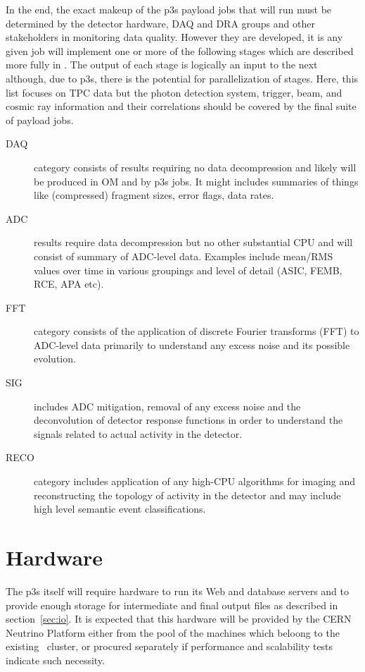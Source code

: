 \documentclass[pdftex,12pt,letter]{article}
\begin{document}
In the end, the exact makeup of the p3s payload jobs that will run
must be determined by the detector hardware, DAQ and DRA groups and
other stakeholders in monitoring data quality.  However they are
developed, it is any given job will implement one or more of the
following stages which are described more fully in \cite{docdb1811}.
The output of each stage is logically an input to the next although,
due to p3s, there is the potential for parallelization of stages.
Here, this list focuses on TPC data but the photon detection system,
trigger, beam, and cosmic ray information and their correlations
should be covered by the final suite of payload jobs.

\begin{description}

\item[DAQ] category consists of results requiring no data
  decompression and likely will be produced in OM and by p3s jobs.  It
  might includes summaries of things like (compressed) fragment sizes,
  error flags, data rates.

\item[ADC] results require data decompression but no other substantial
  CPU and will consist of summary of ADC-level data.  Examples include
  mean/RMS values over time in various groupings and level of detail
  (ASIC, FEMB, RCE, APA etc).

\item[FFT] category consists of the application of discrete Fourier
  transforms (FFT) to ADC-level data primarily to understand any
  excess noise and its possible evolution.

\item[SIG] includes ADC mitigation, removal of any excess noise and
  the deconvolution of detector response functions in order to
  understand the signals related to actual activity in the detector.

\item[RECO] category includes application of any high-CPU algorithms
  for imaging and reconstructing the topology of activity in the
  detector and may include high level semantic event classifications.

\end{description}

\section{Hardware}
\label{sec:hardware}
The p3s itself will require hardware to run its Web and database
servers and to provide enough storage for intermediate and final
output files as described in section~\ref{sec:io}.  It is expected
that this hardware will be provided by the CERN Neutrino Platform
either from the pool of the machines which beloong to the
existing~\cite{neut} cluster, or procured separately if performance
and scalability tests indicate such necessity.
\end{document}
